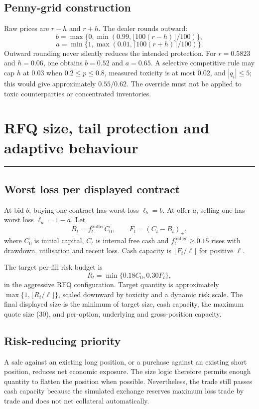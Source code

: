 \documentclass[10pt,a4paper]{article}
\newcommand{\1}{\mathbf{1}}
\newcommand{\sectionrule}{\vspace{-2pt}\noindent\color{navy}\rule{\textwidth}{0.7pt}\color{black}\vspace{2pt}}
\begin{document}
\subsection{Penny-grid construction}
Raw prices are $r-h$ and $r+h$.  The dealer rounds outward:
\[
 b=\max\{0,\min(0.99,\lfloor100(r-h)\rfloor/100)\},
\]
\[
 a=\min\{1,\max(0.01,\lceil100(r+h)\rceil/100)\}.
\]
Outward rounding never silently reduces the intended protection.  For $r=0.5823$ and
$h=0.06$, one obtains $b=0.52$ and $a=0.65$.  A selective competitive rule may cap
$h$ at $0.03$ when $0.2\le p\le0.8$, measured toxicity is at most $0.02$, and
$|q_i|\le5$; this would give approximately $0.55/0.62$.  The override must not be
applied to toxic counterparties or concentrated inventories.

\clearpage

\section{RFQ size, tail protection and adaptive behaviour}
\sectionrule

\subsection{Worst loss per displayed contract}
At bid $b$, buying one contract has worst loss $\ell_b=b$.  At offer $a$, selling one
has worst loss $\ell_a=1-a$.  Let
\[
 B_t=f_t^{\mathrm{buffer}}C_0,\qquad F_t=(C_t-B_t)_+,
\]
where $C_0$ is initial capital, $C_t$ is internal free cash and
$f_t^{\mathrm{buffer}}\ge0.15$ rises with drawdown, utilisation and recent loss.  Cash
capacity is $\lfloor F_t/\ell\rfloor$ for positive $\ell$.

The target per-fill risk budget is
\[
 R_t=\min\{0.18C_0,0.30F_t\},
\]
in the aggressive RFQ configuration.  Target quantity is approximately
$\max\{1,\lfloor R_t/\ell\rfloor\}$, scaled downward by toxicity and a dynamic risk
scale.  The final displayed size is the minimum of target size, cash capacity, the
maximum quote size (30), and per-option, underlying and gross-position capacity.

\subsection{Risk-reducing priority}
A sale against an existing long position, or a purchase against an existing short
position, reduces net economic exposure.  The size logic therefore permits enough
quantity to flatten the position when possible.  Nevertheless, the trade still passes
cash capacity because the simulated exchange reserves maximum loss trade by trade and
does not net collateral automatically.
\end{document}
